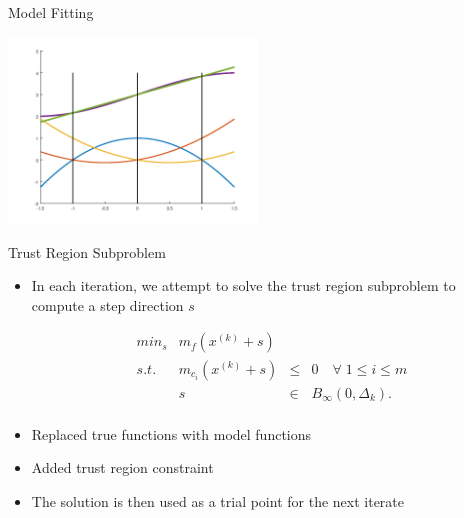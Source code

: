 \documentclass{beamer}
\newcommand{\xk}{{{x}^{(k)}}}
\newcommand{\dk}{{\Delta_k}}
\newcommand{\mk}{{m_f}}
\newcommand{\mck}{{m_{c_i}}}
\begin{document}
\begin{frame}{Model Fitting}
	\begin{center}
		\includegraphics[width=250px]{images/lagrange_polynomials.png}
	\end{center}
\end{frame}


\begin{frame}{Trust Region Subproblem}
    \begin{itemize}
        \item In each iteration, we attempt to solve the trust region subproblem to compute a step direction $s$

        \begin{displaymath}
\begin{array}{lrcc}
min_s & \mk(\xk + s)   &     &            \\
s.t.  &  \mck(\xk + s) & \le & 0   \quad \forall \; 1 \le i \le m       \\
      &  s & \in & B_{\infty}(0, \dk).  \\
\end{array}
        \end{displaymath}
        \item Replaced true functions with model functions
        \item Added trust region constraint
        \item The solution is then used as a trial point for the next iterate
    \end{itemize}
\end{frame}
\end{document}
